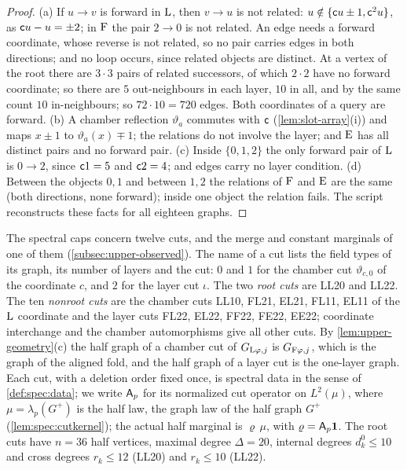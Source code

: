 \begin{proof}
(a) If $u\to v$ is forward in $\rm L$, then $v\to u$ is not related:
$u\notin\{\mathsf c u\pm1,\mathsf c^2u\}$, as $\mathsf c u-u=\pm2$; in $\rm F$ the pair $2\to0$ is
not related. An edge needs a forward coordinate, whose reverse is not related, so no
pair carries edges in both directions; and no loop occurs, since related objects are
distinct.
At a vertex of the root there are $3\cdot3$ pairs of related successors, of which
$2\cdot2$ have no forward coordinate; so there are $5$ out-neighbours in each
layer, $10$ in all, and by the same count $10$ in-neighbours; so $72\cdot10=720$
edges. Both coordinates of a query are forward. (b) A chamber reflection
$\vartheta_a$ commutes with $\mathsf c$ (\cref{lem:slot-array}(i)) and maps $x\pm1$ to
$\vartheta_a(x)\mp1$; the relations do not involve the layer; and $\rm E$ has all
distinct pairs and no forward pair.
(c) Inside $\{0,1,2\}$ the only forward pair of $\rm L$ is $0\to2$, since
$\mathsf c1=5$ and $\mathsf c2=4$; and edges carry no layer condition. (d) Between the
objects $0,1$ and between $1,2$ the relations of $\rm F$ and $\rm E$ are the
same (both directions, none forward); inside one object the relation fails.
The script  reconstructs these
facts for all eighteen graphs.
\end{proof}

The spectral caps concern twelve cuts, and the merge and constant marginals of
one of them (\cref{subsec:upper-observed}). The name of a cut lists the field types
of its graph, its number of layers and the cut: $0$ and $1$ for the chamber cut
$\vartheta_{c,0}$ of the coordinate $c$, and $2$ for the layer cut $\iota$. The
two \emph{root cuts} are LL20 and LL22. The ten \emph{nonroot cuts} are the
chamber cuts LL10, FL21, EL21, FL11, EL11 of the $\rm L$ coordinate and the layer
cuts FL22, EL22, FF22, FE22, EE22; coordinate interchange and the chamber
automorphisms give all other cuts. By \cref{lem:upper-geometry}(c) the half graph
of a chamber cut of $G_{{\rm L}\varphi,j}$ is $G_{{\rm F}\varphi,j}$, which is the
graph of the aligned fold, and the half graph of a layer cut is the one-layer
graph. Each cut, with a deletion order fixed once, is spectral data in the sense
of \cref{def:spec:data}; we write $\mathsf A_p$ for its normalized cut operator on
$L^2(\mu)$, where $\mu=\lambda_p(G^+)$ is the half law, the graph law of the half
graph $G^+$ (\cref{lem:spec:cutkernel}); the actual half marginal is $\varrho\,\mu$,
with $\varrho=\mathsf A_p\mathbf 1$. The root cuts have $n=36$ half
vertices, maximal degree $\Delta=20$, internal degrees $d^0_k\le10$ and cross
degrees $r_k\le12$ (LL20) and $r_k\le10$ (LL22).

